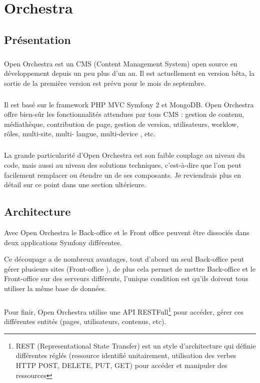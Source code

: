 \chapter{Orchestra}
\section{Présentation}
        \paragraph{}
        Open Orchestra est un CMS (Content Management  System) open source en développement depuis un peu plus d'un an. Il est actuellement en version bêta, la sortie de la première version est prévu pour le mois de septembre.
        \paragraph{}
        Il est basé sur le framework PHP MVC Symfony 2 et MongoDB. Open Orchestra offre bien-sûr les fonctionnalités attendues par tous CMS : gestion de contenu, médiathèque, contribution de page, gestion de version, utilisateurs, worklow, rôles,  multi-site, multi- langue,  multi-device , etc.
        \paragraph{}
        La grande particularité d'Open Orchestra est son faible couplage au niveau du code, mais aussi au niveau des solutions techniques, c'est-à-dire que l'on peut facilement remplacer ou étendre un de ses composants. Je reviendrais plus en détail sur ce point dans une section ultérieure.
        
        \section{Architecture}
       Avec Open Orchestra le \og Back-office \fg{} et le \og Front office \fg{} peuvent être dissociés dans deux applications Symfony différentes. 

        Ce découpage a de nombreux avantages, tout d'abord un seul \og Back-office \fg{}  peut gérer plusieurs sites (\og Front-office \fg{}), de plus cela permet de mettre \og Back-office \fg{} et le \og Front-office \fg{} sur des serveurs différents, l'unique condition est qu'ils doivent tous utiliser la même base de données.
        \paragraph{}
		Pour finir, Open Orchestra utilise une API RESTFull\footnote{REST (Representational State Transfer) est un style d'architecture qui définie différentes réglés (ressource identifié unitairement, utilisation des verbes HTTP POST, DELETE, PUT, GET) pour accéder et manipuler des ressources } pour  accéder, gérer ces différentes entités (pages, utilisateurs, contenus, etc).
